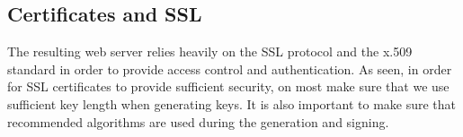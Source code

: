 \subsection {Certificates and SSL}

The resulting web server relies heavily on the SSL protocol and the x.509 standard in order to provide access control and authentication. As seen, in order for SSL certificates to provide sufficient security, on most make sure that we use sufficient key length when generating keys. It is also important to make sure that recommended algorithms are used during the generation and signing.\cite{cipher} 




